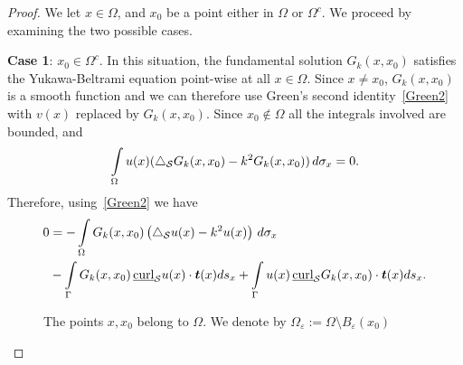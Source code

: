 \begin{proof} 
We let $x\in \Omega$, and $x_0$ be a point either in $\Omega$ or
$\Omega^c$.  We proceed by examining the two possible cases.

{\bf Case 1}:  $x_{0} \in \Omega^{c}$.  In this situation, the
fundamental solution $G_{k}(x,x_{0})$ satisfies the Yukawa-Beltrami
equation point-wise at all $x\in \Omega$. Since $x \neq x_0$,
$G_{k}(x,x_0)$ is a smooth function and we can therefore use Green's
second identity~\eqref{Green2} with $v(x)$ replaced by
$G_{k}(x,x_{0})$. Since $x_0\not \in \Omega$ all the
integrals involved are bounded, and 
\begin{align*}
  \int\limits_{\Omega} u(x)(\bigtriangleup_{\mathcal{S}}G_{k}(x,x_0) 
      -k^{2}G_{k}(x,x_0)) \, d\sigma_x=0.
\end{align*}
Therefore, using~\eqref{Green2} we have 
\begin{align*}
 0 &= - \int\limits_{\Omega}
    G_k(x,x_{0})\left(\lap_{\S}u(x) -k^2 u(x)\right)\,d\sigma_x \\
    &-\int\limits_{{\Gamma}} G_k(x,x_{0}) \, \underline{\mbox{curl}}_{\S}
    u(x) \cdot \vec{t}(x) ds_{x} 
 + \int\limits_{{\Gamma}}  u(x)
 \,\underline{\mbox{curl}}_{{\S}} G_k(x,x_0) \cdot \vec{t}(x) ds_{x}.
\end{align*}
\begin{figure}
  \centering
  
  \caption{\label{f:proof1} The points $x,x_0$ belong to $\Omega$. We
  denote by $\Omega_\varepsilon:=\Omega\setminus B_{\varepsilon}(x_0)$}
\end{figure}


\end{proof}
